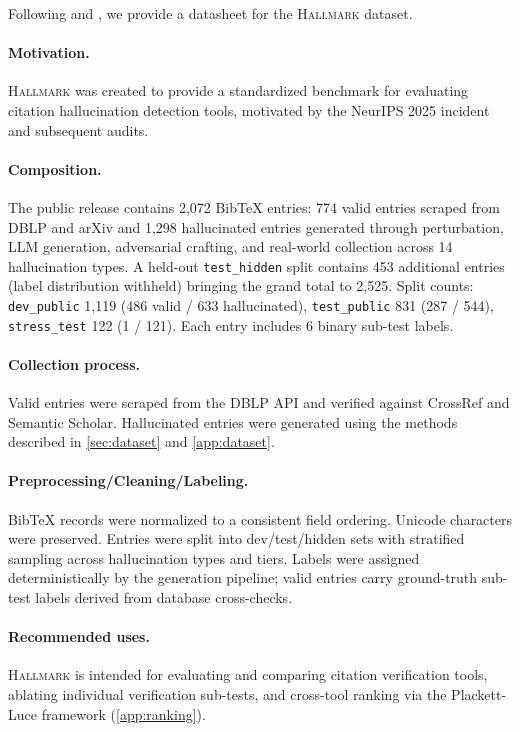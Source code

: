 Following \citet{gebru2021datasheets} and \citet{holland2020dataset}, we provide a datasheet for the \textsc{Hallmark} dataset.

\paragraph{Motivation.}
\textsc{Hallmark} was created to provide a standardized benchmark for evaluating citation hallucination detection tools, motivated by the NeurIPS 2025 incident and subsequent audits.

\paragraph{Composition.}
The public release contains 2,072 BibTeX entries: 774 valid entries scraped from DBLP and arXiv and 1,298 hallucinated entries generated through perturbation, LLM generation, adversarial crafting, and real-world collection across 14 hallucination types.
A held-out \texttt{test\_hidden} split contains 453 additional entries (label distribution withheld) bringing the grand total to 2,525.
Split counts: \texttt{dev\_public} 1,119 (486 valid / 633 hallucinated), \texttt{test\_public} 831 (287 / 544), \texttt{stress\_test} 122 (1 / 121).
Each entry includes 6 binary sub-test labels.

\paragraph{Collection process.}
Valid entries were scraped from the DBLP API and verified against CrossRef and Semantic Scholar.
Hallucinated entries were generated using the methods described in \cref{sec:dataset} and \cref{app:dataset}.

\paragraph{Preprocessing/Cleaning/Labeling.}
BibTeX records were normalized to a consistent field ordering.
Unicode characters were preserved.
Entries were split into dev/test/hidden sets with stratified sampling across hallucination types and tiers.
Labels were assigned deterministically by the generation pipeline; valid entries carry ground-truth sub-test labels derived from database cross-checks.

\paragraph{Recommended uses.}
\textsc{Hallmark} is intended for evaluating and comparing citation verification tools, ablating individual verification sub-tests, and cross-tool ranking via the Plackett-Luce framework (\cref{app:ranking}).

